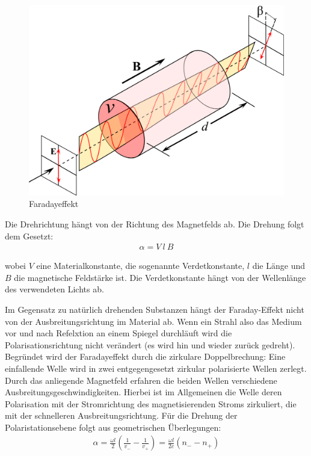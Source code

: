 \documentclass[12pt]{article}
\begin{document}
\begin{figure}[H]
\centering
\includegraphics[width=0.8\linewidth]{pictures/faraday-effect.eps}
\caption{Faradayeffekt}
\end{figure}

Die Drehrichtung hängt von der Richtung des Magnetfelds ab. Die Drehung folgt dem Gesetzt:
\begin{align}
 \alpha = V ~ l ~ B
\end{align}

wobei $V$ eine Materialkonstante, die sogenannte Verdetkonstante, $l$ die Länge und $B$ die magnetische Feldstärke ist.
Die Verdetkonstante hängt von der Wellenlänge des verwendeten Lichts ab.

Im Gegensatz zu natürlich drehenden Substanzen hängt der Faraday-Effekt nicht von der Ausbreitungsrichtung im Material ab.
Wenn ein Strahl also das Medium vor und nach Refelxtion an einem Spiegel durchläuft wird die Polarisationsrichtung nicht verändert (es wird hin und wieder zurück gedreht).\\

Begründet wird der Faradayeffekt durch die zirkulare Doppelbrechung: Eine einfallende Welle wird in zwei entgegengesetzt zirkular polarisierte Wellen zerlegt. Durch das anliegende Magnetfeld erfahren die beiden Wellen verschiedene Ausbreitungsgeschwindigkeiten. Hierbei ist im Allgemeinen die Welle deren Polarisation mit der Stromrichtung des magnetisierenden Stroms zirkuliert, die mit der schnelleren Ausbreitungsrichtung.
Für die Drehung der Polaristationsebene folgt aus geometrischen Überlegungen:
\begin{align}
 \alpha = \frac{\omega l}{2} \left( \frac{1}{v_-} - \frac{1}{v_+} \right) = \frac{\omega l}{2 c} ( n_- - n_+)
\end{align}
\end{document}
